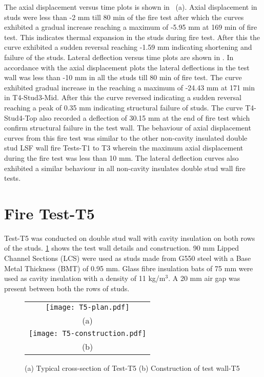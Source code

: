 The axial displacement versus time plots is shown in ~(a). Axial displacement in studs were less than -2 mm till 80 min of the fire test after which the curves exhibited a gradual increase reaching a maximum of -5.95 mm at 169 min of fire test. This indicates thermal expansion in the studs during fire test. After this the curve exhibited a sudden reversal reaching -1.59 mm indicating shortening and failure of the studs. Lateral deflection versus time plots are shown in . In accordance with the axial displacement plots the lateral deflections in the test wall was less than -10 mm in all the studs till 80 min of fire test. The curve exhibited gradual increase in the reaching a maximum of -24.43 mm at 171 min in T4-Stud3-Mid. After this the curve reversed indicating a sudden reversal reaching a peak of 0.35 mm indicating structural failure of studs. The curve T4-Stud4-Top also recorded a deflection of 30.15 mm at the end of fire test which confirm structural failure in the test wall. The behaviour of axial displacement curves from this fire test was similar to the other non-cavity insulated double stud LSF wall fire Tests-T1 to T3 wherein the maximum axial displacement during the fire test was less than 10 mm. The lateral deflection curves also exhibited a similar behaviour in all non-cavity insulates double stud wall fire tests.


\section{Fire Test-T5}

Test-T5 was conducted on double stud wall with cavity insulation on both rows of the studs. \cref{fig:T5-plan-details} shows the test wall details and construction. 90 mm Lipped Channel Sections (LCS) were used as studs made from G550 steel with a Base Metal Thickness (BMT) of 0.95 mm. Glass fibre insulation bats of 75 mm were used as cavity insulation with a density of 11 kg/m\(^3\). A 20 mm air gap was present between both the rows of studs.
\begin{figure}[htbp]
	\centering
		\begin{tabular}{c}
			\texttt{[image: T5-plan.pdf]} \\
			(a)\\ 
			\texttt{[image: T5-construction.pdf]}\\
			(b) \\
		\end{tabular}
		\caption{(a) Typical cross-section of Test-T5 (b) Construction of test wall-T5}
		\label{fig:T5-plan-details}
\end{figure}   

